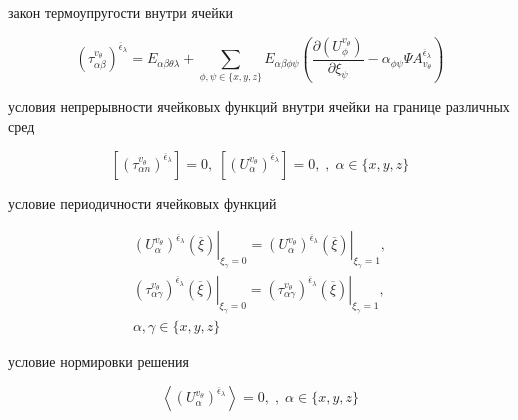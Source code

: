 закон термоупругости внутри ячейки

\begin{equation}
    \label{elhp:eq40}
    \left( \tau_{\alpha\beta}^{v_{\theta}} \right)^{ \overline{\epsilon}_{\lambda} } =
    E_{\alpha\beta\theta\lambda} +
    \sum_{ \phi,\psi \in \{x,y,z\} } E_{\alpha\beta\phi\psi}
    \left( 
        \frac{\partial \left( U_{\phi}^{v_{\theta}} \right) }{\partial \xi_{\psi}} - \alpha_{\phi\psi} \Psi A_{v_{\theta}}^{ \overline{\epsilon}_{\lambda}} 
    \right) 
\end{equation}

условия непрерывности ячейковых функций внутри ячейки на границе различных сред

\begin{equation}
    \label{elhp:eq41}
    \left[ \left( \tau_{\alpha n}^{v_{\theta}} \right)^{ \overline{\epsilon}_{\lambda} }  \right] = 0
    ,\;
    \left[ \left( U_{\alpha}^{v_{\theta}} \right)^{ \overline{\epsilon}_{\lambda} }  \right] = 0
    ,\;
    , \; \alpha \in \{x,y,z\}
\end{equation}

условие периодичности ячейковых функций

\begin{equation}
    \label{elhp:eq42}
    \begin{gathered}
    \left.  \left( U_{\alpha}^{v_{\theta}} \right)^{ \overline{\epsilon}_{\lambda}} \left( \overline{\xi}  \right)   \right|_{\xi_{\gamma} = 0}
    =
    \left.  \left( U_{\alpha}^{v_{\theta}} \right)^{ \overline{\epsilon}_{\lambda}} \left( \overline{\xi}  \right)   \right|_{\xi_{\gamma} = 1}
    , \\
    \left.  \left( \tau_{\alpha \gamma}^{v_{\theta}} \right)^{ \overline{\epsilon}_{\lambda}} \left( \overline{\xi}  \right)   \right|_{\xi_{\gamma} = 0}
    =
    \left.  \left( \tau_{\alpha \gamma}^{v_{\theta}} \right)^{ \overline{\epsilon}_{\lambda}} \left( \overline{\xi}  \right)   \right|_{\xi_{\gamma} = 1}
    , \\
    \alpha, \gamma \in \{x,y,z\} 
    \end{gathered}
\end{equation}

условие нормировки решения

\begin{equation}
    \label{elhp:eq43}
    \left< \left( U_{\alpha}^{v_{\theta}} \right)^{ \overline{\epsilon}_{\lambda}}  \right> = 0 ,\; , \; \alpha \in \{x,y,z\}
\end{equation}

